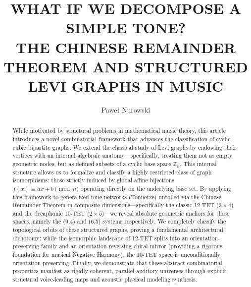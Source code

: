 \documentclass[11pt,letterpaper]{amsart}
\begin{document}
\title[WHAT IF WE DECOMPOSE A SIMPLE TONE?]{WHAT IF WE DECOMPOSE A SIMPLE TONE? \\[0.5ex] THE CHINESE REMAINDER THEOREM AND STRUCTURED LEVI GRAPHS IN MUSIC}

\author{Pawe{\l} Nurowski}
\address{Centrum Fizyki Teoretycznej,
Polska Akademia Nauk, Al.
Lotnik\'ow 32/46, 02-668 Warszawa, Poland, and
Guangdong Technion -- Israel Institute of Technology, No. 241, Daxue Road,
Jinping District, Shantou, Guangdong Province, China}

\maketitle

\begin{abstract}
While motivated by structural problems in mathematical music theory, this article introduces a novel combinatorial framework that advances the classification of cyclic cubic bipartite graphs. We extend the classical study of Levi graphs by endowing their vertices with an internal algebraic anatomy—specifically, treating them not as empty geometric nodes, but as defined subsets of a cyclic base space $\mathbb{Z}_n$. This internal structure allows us to formalize and classify a highly restricted class of graph isomorphisms: those strictly induced by global affine bijections $f(x) \equiv ax+b \pmod n$ operating directly on the underlying base set. 
By applying this framework to generalized tone networks (Tonnetze) unrolled via the Chinese Remainder Theorem in composite dimensions—specifically the classic 12-TET ($3\times4$) and the decaphonic 10-TET ($2\times5$)—we reveal absolute geometric anchors for these spaces, namely the (9,4) and (6,5) systems respectively. We completely classify the topological orbits of these structured graphs, proving a fundamental architectural dichotomy: while the isomorphic landscape of 12-TET splits into an orientation-preserving family and an orientation-reversing chiral mirror (providing a rigorous foundation for musical Negative Harmony), the 10-TET space is unconditionally orientation-preserving. Finally, we demonstrate that these abstract combinatorial properties manifest as rigidly coherent, parallel auditory universes through explicit structural voice-leading maps and acoustic physical modeling synthesis.
\end{abstract}
\end{document}

